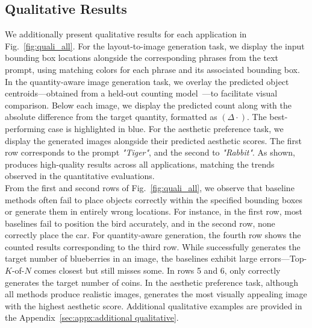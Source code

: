 \subsection{Qualitative Results}
\label{sec:experiments:qualitative}
\vspace{-0.1cm}
We additionally present qualitative results for each application in Fig.~\ref{fig:quali_all}. For the layout-to-image generation task, we display the input bounding box locations alongside the corresponding phrases from the text prompt, using matching colors for each phrase and its associated bounding box.
In the quantity-aware image generation task, we overlay the predicted object centroids—obtained from a held-out counting model~\cite{AminiNaieni2024countgd}—to facilitate visual comparison. Below each image, we display the predicted count along with the absolute difference from the target quantity, formatted as $(\Delta\cdot)$. The best-performing case is highlighted in blue.
For the aesthetic preference task, we display the generated images alongside their predicted aesthetic scores. The first row corresponds to the prompt \textit{"Tiger"}, and the second to \textit{"Rabbit"}. As shown, \methodname{} produces high-quality results across all applications, matching the trends observed in the quantitative evaluations. \\
From the first and second rows of Fig.~\ref{fig:quali_all}, we observe that baseline methods often fail to place objects correctly within the specified bounding boxes or generate them in entirely wrong locations. For instance, in the first row, most baselines fail to position the bird accurately, and in the second row, none correctly place the car. For quantity-aware generation, the fourth row shows the counted results corresponding to the third row. While \methodname{} successfully generates the target number of blueberries in an image, the baselines exhibit large errors—Top-$K$-of-$N$ comes closest but still misses some. In rows 5 and 6, only \methodname{} correctly generates the target number of coins. In the aesthetic preference task, although all methods produce realistic images, \methodname{} generates the most visually appealing image with the highest aesthetic score. 
Additional qualitative examples are provided in the Appendix~\ref{sec:appx:additional qualitative}.
\vspace{-0.1cm}
